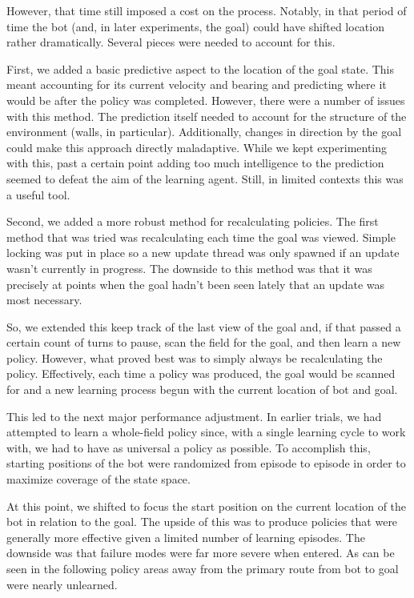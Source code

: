 \documentclass{aiaa-tc}%
\begin{document}
However, that time still imposed a cost on the process. Notably, in
that period of time the bot (and, in later experiments, the goal)
could have shifted location rather dramatically. Several pieces were
needed to account for this.

First, we added a basic predictive aspect to the location of the goal
state. This meant accounting for its current velocity and bearing and
predicting where it would be after the policy was completed. However,
there were a number of issues with this method. The prediction itself
needed to account for the structure of the environment (walls, in
particular). Additionally, changes in direction by the goal could make
this approach directly maladaptive. While we kept experimenting with
this, past a certain point adding too much intelligence to the
prediction seemed to defeat the aim of the learning agent. Still, in
limited contexts this was a useful tool.

Second, we added a more robust method for recalculating policies. The
first method that was tried was recalculating each time the goal
was viewed. Simple locking was put in place so a new update thread was
only spawned if an update wasn't currently in progress. The downside
to this method was that it was precisely at points when the goal
hadn't been seen lately that an update was most necessary.

So, we extended this keep track of the last view of the goal and, if
that passed a certain count of turns to pause, scan the field for the
goal, and then learn a new policy. However, what proved best was to
simply always be recalculating the policy. Effectively, each time a
policy was produced, the goal would be scanned for and a new learning
process begun with the current location of bot and goal.

This led to the next major performance adjustment. In earlier trials,
we had attempted to learn a whole-field policy since, with a single
learning cycle to work with, we had to have as universal a policy as
possible. To accomplish this, starting positions of the bot were
randomized from episode to episode in order to maximize coverage of
the state space.

At this point, we shifted to focus the start position
on the current location of the bot in relation to the goal. The upside
of this was to produce policies that were generally more effective
given a limited number of learning episodes. The downside was that
failure modes were far more severe when entered. As can be seen in the
following policy areas away from the primary route from bot to goal
were nearly unlearned.
\end{document}
